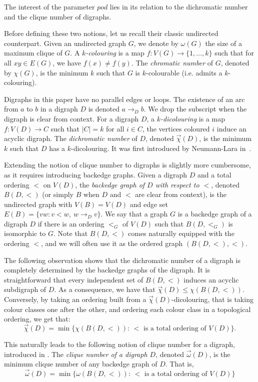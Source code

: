 \documentclass{article}
\newcommand{\dic}{\vec\chi}
\renewcommand{\le}{\leqslant}
\begin{document}
The interest of the parameter $pod$ lies in its relation to the dichromatic number and the clique number of digraphs.

Before defining these two notions, let us recall their classic undirected counterpart. 
Given an undirected graph $G$, we denote by $\omega(G)$ the size of a maximum clique of $G$. A \textit{$k$-colouring} is a map $f:V(G) \to \{1,\ldots,k\}$ such that for all $xy \in E(G)$, we have $f(x) \neq f(y)$. The \textit{chromatic number} of $G$, denoted by $\chi(G)$, is the minimum $k$ such that $G$ is $k$-colourable (i.e. admits a $k$-colouring).


Digraphs in this paper have no parallel edges or loops. The existence of an arc from $a$ to $b$ in a digraph $D$ is denoted $a \to_D b$. We drop the subscript when the digraph is clear from context. 
For a digraph $D$, a \textit{$k$-dicolouring} is a map $f:V(D) \to C$ such that $|C| = k$ for all $i \in C$, the vertices coloured $i$ induce an acyclic digraph.  The \textit{dichromatic number} of $D$, denoted $\dic(D)$, is the minimum $k$ such that $D$ has a $k$-dicolouring. It was first introduced by Neumann-Lara in~\cite{neumann}.


Extending the notion of clique number to digraphs is slightly more cumbersome, as it requires introducing backedge graphs. Given a digraph $D$ and a total ordering $<$ on $V(D)$, the \textit{backedge graph of $D$ with respect to $<$}, denoted $B(D,<)$ (or simply $B$ when $D$ and $<$ are clear from context), is the undirected graph with $V(B)=V(D)$ and edge set $E(B)=\{vw : v<w,\ w\to_D v\}$. We say that a graph $G$ is a backedge graph of a digraph $D$ if there is an ordering $<_G$ of $V(D)$ such that $B(D,<_G)$ is isomorphic to $G$. Note that $B(D,<)$ comes naturally equipped with the ordering $<$, and we will often use it as the ordered graph $(B(D,<),<)$.

The following observation shows that the dichromatic number of a digraph  is completely determined by the backedge graphs of the digraph. 
It is straightforward that every independent set  of $B(D,<)$ induces an acyclic subdigraph of $D$. As a consequence, we have that $\dic(D) \le \chi(B(D, <))$. 
Conversely, by taking an ordering built from a $\dic(D)$-dicolouring,
that is taking colour classes one after the other, and ordering each colour class in a topological ordering, we get that:
\[\vec{\chi}(D) = \min\{\chi(B(D,<)):\, < \text{ is a total ordering of } V(D)\}.
\] 

This naturally leads to the following notion of clique number for a digraph, introduced in \cite{original}. 
The \textit{clique number of a digraph $D$}, denoted $\vec{\omega}(D)$, is the minimum clique number of any backedge graph of $D$. That is, 
\[\vec{\omega}(D) = \min\{\omega(B(D,<)):\, < \text{ is a total ordering of } V(D)\}\]
\end{document}
